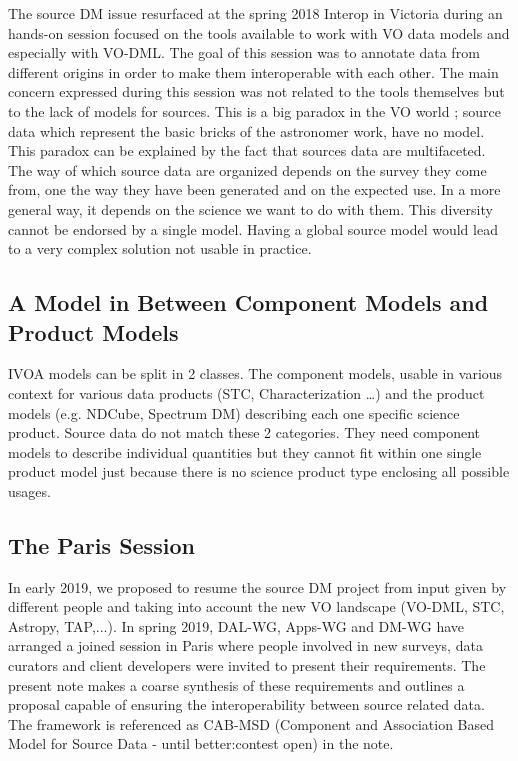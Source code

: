\documentclass[11pt,a4paper]{ivoa}
\begin{document}
The source DM issue resurfaced at the spring 2018 Interop in Victoria during an hands-on session focused on the tools available to work with VO data models and especially with VO-DML. The goal of this session was to annotate data from different origins in order to make them interoperable with each other. The main concern expressed during this session was not related to the tools themselves but to the lack of models for sources. 
This is a big paradox in the VO world ; source data which represent the basic bricks of the astronomer work, have no model. This paradox can be explained by the fact that sources data are multifaceted. The way of which source data are organized depends on the survey they come from, one the way they have been generated  and on the expected use. In a more general way, it depends on the science we want to do with them. This diversity cannot be endorsed by a single model. Having a global source model would lead to a very complex solution not usable in practice.

\subsection{A Model in Between Component Models and Product Models}
IVOA models can be split in 2 classes. The component models, usable in various context for various data products (STC, Characterization \dots) and the product models (e.g. NDCube, Spectrum DM) describing each one specific science product.
Source data do not match these 2 categories. They need component models to describe individual quantities but they cannot fit within one single product model just because there is no science product type enclosing all possible usages. 

\subsection{The Paris Session}
In early 2019, we proposed to resume the source DM project from input given by different people and taking into account the new VO landscape (VO-DML, STC, Astropy, TAP,...). In spring 2019, DAL-WG, Apps-WG and DM-WG have arranged a joined session in Paris where people involved in new surveys, data curators and client developers were invited to present their requirements.
The present note makes a coarse synthesis of these requirements and outlines a proposal capable of ensuring the interoperability between source related data. 
The framework is referenced as CAB-MSD (Component and Association Based Model for Source Data  - until better:contest open) in the note.  
\end{document}
